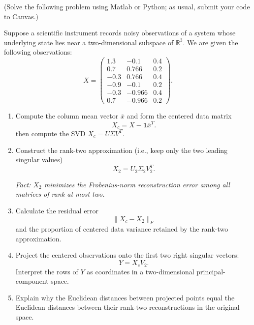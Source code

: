 \documentclass{ximera}
\begin{document}
\begin{exercise}
(Solve the following problem using Matlab or Python; as usual, submit your code to Canvas.)  

Suppose a scientific instrument records noisy observations of a
system whose underlying state lies near a two-dimensional subspace
of $\mathbb{R}^3$. We are given the following observations:
\[
X =
\begin{pmatrix}
1.3 & -0.1 & 0.4\\
0.7 & 0.766 & 0.2\\
-0.3 & 0.766 & 0.4\\
-0.9 & -0.1 & 0.2\\
-0.3 & -0.966 & 0.4\\
0.7 & -0.966 & 0.2
\end{pmatrix}.
\]


\begin{enumerate}[label=\arabic*.]
    \item Compute the column mean vector $\bar{x}$ and form the
    centered data matrix
    \[
    X_c = X - \mathbf{1}\bar{x}^{T}.
    \]
    then compute the SVD $ X_c = U\Sigma V^T$.

    \item Construct the rank-two approximation (i.e., keep only the two leading singular values)
    \[
    X_2 = U_2\Sigma_2V_2^T.
    \]
    
    
   \textit{Fact: $X_2$ minimizes the Frobenius-norm reconstruction
    error among all matrices of rank at most two.}

    \item Calculate the residual error
    \[
    \|X_c-X_2\|_F
    \]
    and the proportion of centered data variance retained by
    the rank-two approximation.

    \item Project the centered observations onto the first two
    right singular vectors:
    \[
    Y = X_cV_2.
    \]
    Interpret the rows of $Y$ as coordinates in a
    two-dimensional principal-component space.

    \item Explain why the Euclidean distances between projected
    points equal the Euclidean distances between their rank-two
    reconstructions in the original space.
\end{enumerate}


\end{exercise}
\end{document}
